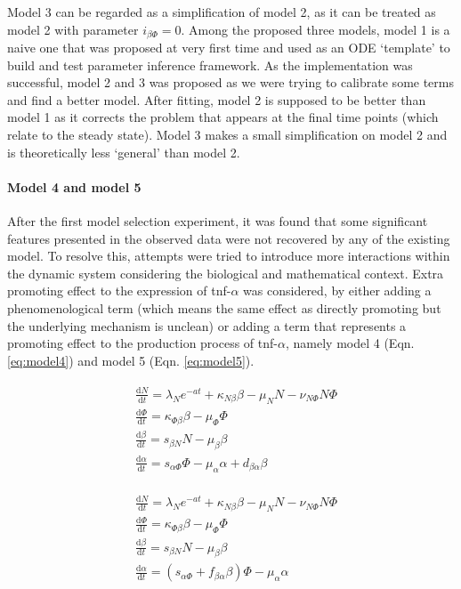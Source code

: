 Model 3 can be regarded as a simplification of model 2, as it can be treated as model 2 with parameter $i_{\beta\Phi}=0$. Among the proposed three models, model 1 is a naive one that was proposed at very first time and used as an ODE `template' to build and test parameter inference framework. As the implementation was successful, model 2 and 3 was proposed as we were trying to calibrate some terms and find a better model. After fitting, model 2 is supposed to be better than model 1 as it corrects the problem that appears at the final time points (which relate to the steady state). Model 3 makes a small simplification on model 2 and is theoretically less `general' than model 2.

\paragraph{Model 4 and model 5}

After the first model selection experiment, it was found that some significant features presented in the observed data were not recovered by any of the existing model. To resolve this, attempts were tried to introduce more interactions within the dynamic system considering the biological and  mathematical context. Extra promoting effect to the expression of tnf-$\alpha$ was considered, by either adding a phenomenological term (which means the same effect as directly promoting but the underlying mechanism is unclean) or adding a term that represents a promoting effect to the production process of tnf-$\alpha$, namely model 4 (Eqn. \ref{eq:model4}) and model 5 (Eqn. \ref{eq:model5}).

\begin{align}
    \label{eq:model4}
    \begin{split}
        &\frac{\mathrm{d} N}{\mathrm{d} t}=\lambda_Ne^{-at}+\kappa_{N\beta}\beta-\mu_NN-\nu_{N\Phi}N\Phi\\
        &\frac{\mathrm{d} \Phi}{\mathrm{d} t}=\kappa_{\Phi\beta}\beta-\mu_\Phi\Phi\\
        &\frac{\mathrm{d} \beta}{\mathrm{d} t}=s_{\beta N}N-\mu_\beta\beta\\
        &\frac{\mathrm{d} \alpha}{\mathrm{d} t}=s_{\alpha\Phi}\Phi-\mu_\alpha\alpha+d_{\beta\alpha}\beta
    \end{split}
\end{align}

\begin{align}
    \label{eq:model5}
    \begin{split}
        &\frac{\mathrm{d} N}{\mathrm{d} t}=\lambda_Ne^{-at}+\kappa_{N\beta}\beta-\mu_NN-\nu_{N\Phi}N\Phi\\
        &\frac{\mathrm{d} \Phi}{\mathrm{d} t}=\kappa_{\Phi\beta}\beta-\mu_\Phi\Phi\\
        &\frac{\mathrm{d} \beta}{\mathrm{d} t}=s_{\beta N}N-\mu_\beta\beta\\
        &\frac{\mathrm{d} \alpha}{\mathrm{d} t}=(s_{\alpha\Phi}+f_{\beta\alpha}\beta)\Phi-\mu_\alpha\alpha
    \end{split}
\end{align}

